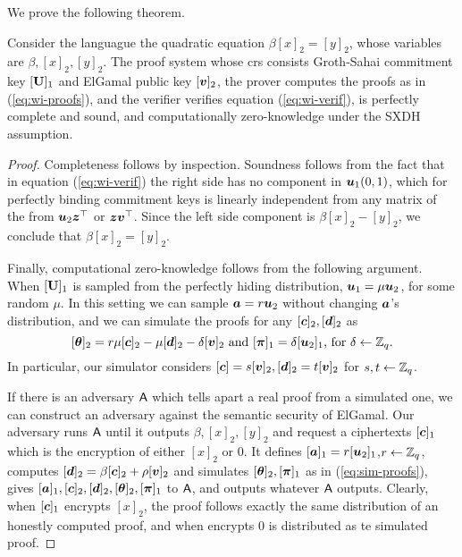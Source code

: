 We prove the following theorem.
\begin{theorem}
Consider the languague the quadratic equation $\beta[x]_2 = [y]_2$, whose variables are $\beta,[x]_2,[y]_2$. 
The proof system whose crs consists Groth-Sahai commitment key $[\mathbf{{U}}]_1$ and ElGamal public key $[{\boldsymbol{v}}]_2$, the prover computes the proofs as in (\ref{eq:wi-proofs}), and the verifier verifies equation (\ref{eq:wi-verif}), is perfectly complete and sound, and computationally zero-knowledge under the SXDH assumption.
\end{theorem}
\begin{proof}
Completeness follows by inspection. Soundness follows from the fact that in equation (\ref{eq:wi-verif}) the right side has no component in ${\boldsymbol{u}}_1(0,1)$, which for perfectly binding commitment keys is linearly independent from any matrix of the from ${\boldsymbol{u}}_2{\boldsymbol{z}}^\top$ or ${\boldsymbol{z}}{\boldsymbol{v}}^\top$. Since the left side component is $\beta[x]_2-[y]_2$, we conclude that $\beta[x]_2 = [y]_2$.

Finally, computational zero-knowledge follows from the following argument.
When $[\mathbf{{U}}]_1$ is sampled from the perfectly hiding distribution, ${\boldsymbol{u}}_1 = \mu{\boldsymbol{u}}_2$, for some random $\mu$. In this setting we can sample ${\boldsymbol{a}} = r{\boldsymbol{u}}_2$ without changing ${\boldsymbol{a}}$'s distribution, and we can simulate the proofs for any $[{\boldsymbol{c}}]_2,[{\boldsymbol{d}}]_2$ as 
\begin{equation} \label{eq:sim-proofs}
[{\boldsymbol{\theta}}]_2 = r\mu[{\boldsymbol{c}}]_2-\mu[{\boldsymbol{d}}]_2-\delta[{\boldsymbol{v}}]_2\text{ and }[{\boldsymbol{\pi}}]_1 = \delta[{\boldsymbol{u}}_2]_1\text{, for } \delta\gets\mathbb{Z}_q.
\end{equation} 
In particular, our simulator considers $[{\boldsymbol{c}}]=s[{\boldsymbol{v}}]_2,[{\boldsymbol{d}}]_2=t[{\boldsymbol{v}}]_2$ for $s,t\gets\mathbb{Z}_q$.

If there is an adversary $\mathsf{A}$ which tells apart a real proof from a simulated one, we can construct an adversary against the semantic security of ElGamal. Our adversary  runs $\mathsf{A}$ until it outputs $\beta,[x]_2,[y]_2$ and request a ciphertexts $[{\boldsymbol{c}}]_1$ which is the encryption of either $[x]_2$ or $0$. It defines $[{\boldsymbol{a}}]_1=r[{\boldsymbol{u}}_2]_1$,$ r\gets\mathbb{Z}_q$, computes $[{\boldsymbol{d}}]_2 = \beta[{\boldsymbol{c}}]_2 + \rho[{\boldsymbol{v}}]_2$  and simulates $[{\boldsymbol{\theta}}]_2,[{\boldsymbol{\pi}}]_1$ as in (\ref{eq:sim-proofs}), gives $[{\boldsymbol{a}}]_1,[{\boldsymbol{c}}]_2,[{\boldsymbol{d}}]_2,[{\boldsymbol{\theta}}]_2,[{\boldsymbol{\pi}}]_1$ to $\mathsf{A}$, and outputs whatever $\mathsf{A}$ outputs. Clearly, when $[{\boldsymbol{c}}]_1$ encrypts $[x]_2$, the proof follows exactly the same distribution of an honestly computed proof, and when encrypts $0$ is distributed as te simulated proof.
\end{proof} 

